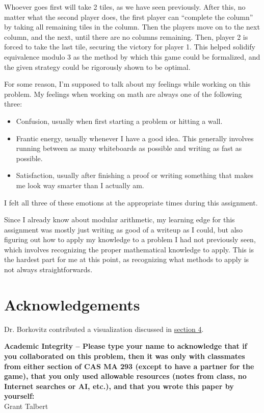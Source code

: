 \documentclass[11pt, letterpaper]{article}
\begin{document}
Whoever goes first will take 2 tiles, as we have seen previously. After this, no matter what the second player does, the first player can ``complete the column'' by taking all remaining tiles in the column. Then the players move on to the next column, and the next, until there are no columns remaining. Then, player 2 is forced to take the last tile, securing the victory for player 1. This helped solidify equivalence modulo 3 as the method by which this game could be formalized, and the given strategy could be rigorously shown to be optimal.

For some reason, I'm supposed to talk about my feelings while working on this problem. My feelings when working on math are always one of the following three:
\begin{itemize}
	\item Confusion, usually when first starting a problem or hitting a wall.
	\item Frantic energy, usually whenever I have a good idea. This generally involves running between as many whiteboards as possible and writing as fast as possible.
	\item Satisfaction, usually after finishing a proof or writing something that makes me look way smarter than I actually am.
\end{itemize}
I felt all three of these emotions at the appropriate times during this assignment.

Since I already know about modular arithmetic, my learning edge for this assignment was mostly just writing as good of a writeup as I could, but also figuring out how to apply my knowledge to a problem I had not previously seen, which involves recognizing the proper mathematical knowledge to apply. This is the hardest part for me at this point, as recognizing what methods to apply is not always straightforwards.
\section{Acknowledgements}
Dr. Borkovitz contributed a visualization discussed in \hyperref[sec:4]{section 4}.

\textbf{Academic Integrity -- Please type your name to acknowledge that if you collaborated on this problem, then it was only with classmates from either section of CAS MA 293 (except to have a partner for the game), that you only used allowable resources (notes from class, no Internet searches or AI, etc.), and that you wrote this paper by yourself:}\\
Grant Talbert
\end{document}
